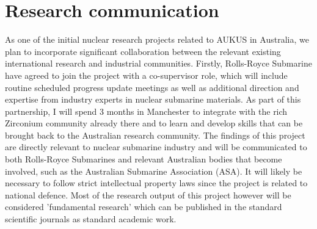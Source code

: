 \chapter{Research communication}

As one of the initial nuclear research projects related to AUKUS in Australia, we plan to incorporate significant collaboration between the relevant existing international research and industrial communities.
Firstly, Rolls-Royce Submarine have agreed to join the project with a co-supervisor role, which will include routine scheduled progress update meetings as well as additional direction and expertise from industry experts in nuclear submarine materials.
As part of this partnership, I will spend 3 months in Manchester to integrate with the rich Zirconium community already there and to learn and develop skills that can be brought back to the Australian research community.
The findings of this project are directly relevant to nuclear submarine industry and will be communicated to both Rolls-Royce Submarines and relevant Australian bodies that become involved, such as the Australian Submarine Association (ASA). It will likely be necessary to follow strict intellectual property laws since the project is related to national defence. Most of the research output of this project however will be considered 'fundamental research' which can be published in the standard scientific journals as standard academic work.